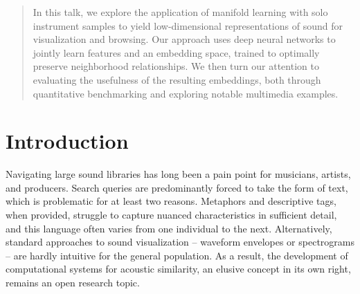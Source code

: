 \documentclass{article}
\begin{document}

\begin{abstract}

In this talk, we explore the application of manifold learning with solo instrument samples to yield low-dimensional representations of sound for visualization and browsing.
Our approach uses deep neural networks to jointly learn features and an embedding space, trained to optimally preserve neighborhood relationships.
We then turn our attention to evaluating the usefulness of the resulting embeddings, both through quantitative benchmarking and exploring notable multimedia examples.


\end{abstract}

\section{Introduction}
\label{submission}


Navigating large sound libraries has long been a pain point for musicians, artists, and producers.
Search queries are predominantly forced to take the form of text, which is problematic for at least two reasons.
Metaphors and descriptive tags, when provided, struggle to capture nuanced characteristics in sufficient detail, and this language often varies from one individual to the next.
Alternatively, standard approaches to sound visualization -- waveform envelopes or spectrograms -- are hardly intuitive for the general population.
As a result, the development of computational systems for acoustic similarity, an elusive concept in its own right, remains an open research topic.
\end{document}
